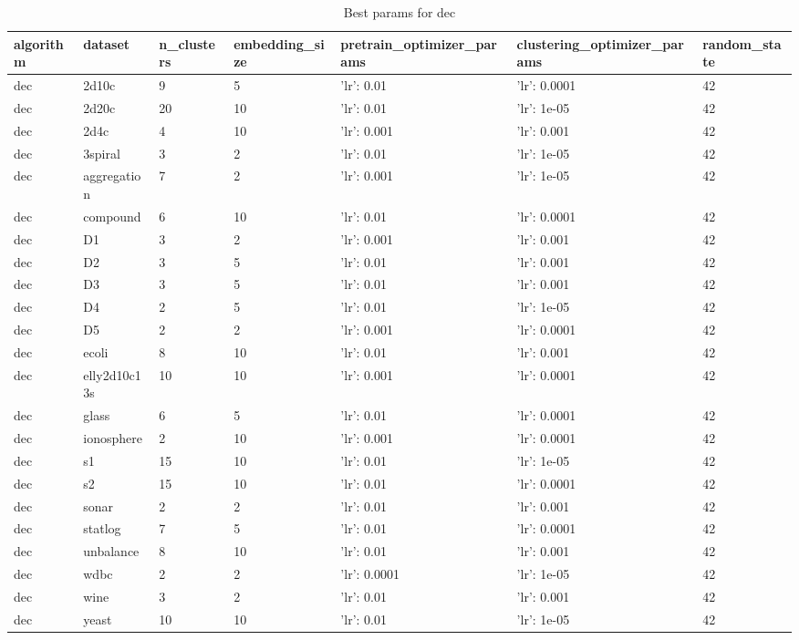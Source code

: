 \begin{table}[H]
\centering
\caption{Best params for dec}
\label{tab:params:dec}
\begin{tabular}{|l|l|l|l|l|l|l|}
\hline
algorithm & dataset & n\_clusters & embedding\_size & pretrain\_optimizer\_params & clustering\_optimizer\_params & random\_state \\
\hline
dec & 2d10c & 9 & 5 & {'lr': 0.01} & {'lr': 0.0001} & 42 \\
\hline
dec & 2d20c & 20 & 10 & {'lr': 0.01} & {'lr': 1e-05} & 42 \\
\hline
dec & 2d4c & 4 & 10 & {'lr': 0.001} & {'lr': 0.001} & 42 \\
\hline
dec & 3spiral & 3 & 2 & {'lr': 0.01} & {'lr': 1e-05} & 42 \\
\hline
dec & aggregation & 7 & 2 & {'lr': 0.001} & {'lr': 1e-05} & 42 \\
\hline
dec & compound & 6 & 10 & {'lr': 0.01} & {'lr': 0.0001} & 42 \\
\hline
dec & D1 & 3 & 2 & {'lr': 0.001} & {'lr': 0.001} & 42 \\
\hline
dec & D2 & 3 & 5 & {'lr': 0.01} & {'lr': 0.001} & 42 \\
\hline
dec & D3 & 3 & 5 & {'lr': 0.01} & {'lr': 0.001} & 42 \\
\hline
dec & D4 & 2 & 5 & {'lr': 0.01} & {'lr': 1e-05} & 42 \\
\hline
dec & D5 & 2 & 2 & {'lr': 0.001} & {'lr': 0.0001} & 42 \\
\hline
dec & ecoli & 8 & 10 & {'lr': 0.01} & {'lr': 0.001} & 42 \\
\hline
dec & elly2d10c13s & 10 & 10 & {'lr': 0.001} & {'lr': 0.0001} & 42 \\
\hline
dec & glass & 6 & 5 & {'lr': 0.01} & {'lr': 0.0001} & 42 \\
\hline
dec & ionosphere & 2 & 10 & {'lr': 0.001} & {'lr': 0.0001} & 42 \\
\hline
dec & s1 & 15 & 10 & {'lr': 0.01} & {'lr': 1e-05} & 42 \\
\hline
dec & s2 & 15 & 10 & {'lr': 0.01} & {'lr': 0.0001} & 42 \\
\hline
dec & sonar & 2 & 2 & {'lr': 0.01} & {'lr': 0.001} & 42 \\
\hline
dec & statlog & 7 & 5 & {'lr': 0.01} & {'lr': 0.0001} & 42 \\
\hline
dec & unbalance & 8 & 10 & {'lr': 0.01} & {'lr': 0.001} & 42 \\
\hline
dec & wdbc & 2 & 2 & {'lr': 0.0001} & {'lr': 1e-05} & 42 \\
\hline
dec & wine & 3 & 2 & {'lr': 0.01} & {'lr': 0.001} & 42 \\
\hline
dec & yeast & 10 & 10 & {'lr': 0.01} & {'lr': 1e-05} & 42 \\
\hline
\end{tabular}
\end{table}